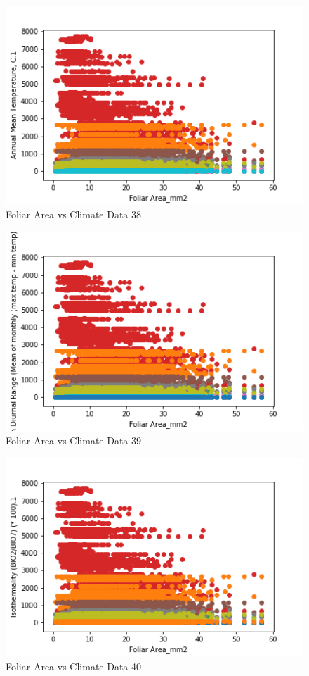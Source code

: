 \documentclass[letterpaper]{article}
\begin{document}
\begin{figure}[h]
\caption{Foliar Area vs Climate Data 38\label{fig:Foliar_Area_vs_38}}
\centering
\includegraphics[width=0.7\paperwidth]{Foliar_Area_vs_38}
\end{figure}


\begin{figure}[h]
\caption{Foliar Area vs Climate Data 39\label{fig:Foliar_Area_vs_39}}
\centering
\includegraphics[width=0.7\paperwidth]{Foliar_Area_vs_39}
\end{figure}


\begin{figure}[h]
\caption{Foliar Area vs Climate Data 40\label{fig:Foliar_Area_vs_40}}
\centering
\includegraphics[width=0.7\paperwidth]{Foliar_Area_vs_40}
\end{figure}
\end{document}
